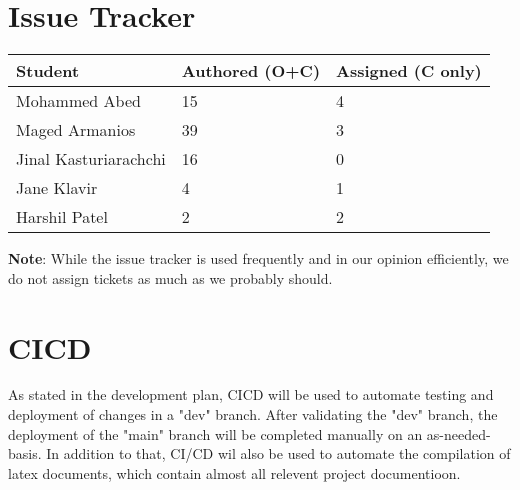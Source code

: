 \documentclass{article}
\begin{document}
\section{Issue Tracker}

\begin{table}[H]
\centering
\begin{tabular}{lll}
\toprule
\textbf{Student} & \textbf{Authored (O+C)} & \textbf{Assigned (C only)}\\
\midrule
Mohammed Abed & 15 & 4 \\
Maged Armanios & 39 & 3 \\
Jinal Kasturiarachchi & 16 & 0 \\
Jane Klavir & 4 & 1 \\
Harshil Patel & 2 & 2 \\
\bottomrule
\end{tabular}
\end{table}

\textbf{Note}: While the issue tracker is used frequently and in our opinion efficiently, we do not assign tickets as much as we probably should.

\section{CICD}

As stated in the development plan, CICD will be used to automate testing and deployment of changes in a "dev" branch. After validating the "dev" branch, the deployment of the "main" branch will be completed manually on an as-needed-basis.
In addition to that, CI/CD wil also be used to automate the compilation of latex documents, which contain almost all relevent project documentioon.
\end{document}
